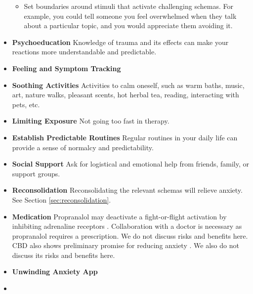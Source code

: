\documentclass[12pt,letterpaper]{article}
\begin{document}
\begin{itemize}
\begin{itemize}
        \item Set boundaries around stimuli that activate challenging schemas. For example, you could tell someone you feel overwhelmed when they talk about a particular topic, and you would appreciate them avoiding it.
    \end{itemize}
    \item \textbf{Psychoeducation} Knowledge of trauma and its effects can make your reactions more understandable and predictable. 
    \item \textbf{Feeling and Symptom Tracking} 
    \item \textbf{Soothing Activities} Activities to calm oneself, such as warm baths, music, art, nature walks, pleasant scents, hot herbal tea, reading, interacting with pets, etc. 
    \item \textbf{Limiting Exposure} Not going too fast in therapy.  
    \item \textbf{Establish Predictable Routines} Regular routines in your daily life can provide a sense of normalcy and predictability. 
    \item \textbf{Social Support} Ask for logistical and emotional help from friends, family, or support groups. 
    \item \textbf{Reconsolidation} Reconsolidating the relevant schemas will relieve anxiety. See Section \ref{sec:reconsolidation}.
    \item \textbf{Medication} Propranalol may deactivate a fight-or-flight activation by inhibiting adrenaline receptors \cite{steenenPropranalol}. Collaboration with a doctor is necessary as propranalol requires a prescription. We do not discuss risks and benefits here. CBD also shows preliminary promise for reducing anxiety \cite{skelleyCBD}. We also do not discuss its risks and benefits here.
    \item \textbf{Unwinding Anxiety App} \todo{}
    \item {}
\end{itemize}
\end{document}
